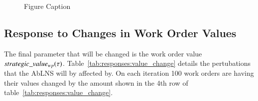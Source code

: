 \begin{figure}[H]%
	\centering
	\resizebox{10cm}{!}{
		
	}
	\caption{Figure Caption}
	\label{fig:responses:resource-subtraction}
\end{figure}


\subsection{Response to Changes in Work Order Values}\label{sec:results:strategic_value_changes}
The final parameter that will be changed is the work order value $
strategic\_value_{w p}(\tau)$. Table~\ref{tab:responses:value_change} details the
pertubations that the AbLNS will by affected by. On each iteration 100 work
orders are having their values changed by the amount  shown in the 4th row of
table~\ref{tab:responses:value_change}.

